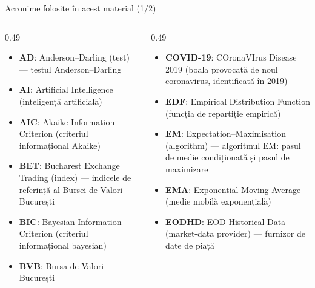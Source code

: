 
{
\begin{frame}[noframenumbering]
    \titlepage
\end{frame}
}
\begin{frame}{Acronime folosite în acest material (1/2)}
\begin{columns}[T]
\begin{column}{0.49\textwidth}
\begin{itemize}\setlength{\itemsep}{0pt}
    \item \textbf{AD}: Anderson–Darling (test) — testul Anderson–Darling
    \item \textbf{AI}: Artificial Intelligence (inteligență artificială)
    \item \textbf{AIC}: Akaike Information Criterion (criteriul informațional Akaike)
    \item \textbf{BET}: Bucharest Exchange Trading (index) — indicele de referință al Bursei de Valori București
    \item \textbf{BIC}: Bayesian Information Criterion (criteriul informațional bayesian)
    \item \textbf{BVB}: Bursa de Valori București
\end{itemize}
\end{column}
\begin{column}{0.49\textwidth}
\begin{itemize}\setlength{\itemsep}{0pt}
    \item \textbf{COVID-19}: COronaVIrus Disease 2019 (boala provocată de noul coronavirus, identificată în 2019)
    \item \textbf{EDF}: Empirical Distribution Function (funcția de repartiție empirică)
    \item \textbf{EM}: Expectation–Maximisation (algorithm) — algoritmul EM: pasul de medie condiționată și pasul de maximizare
    \item \textbf{EMA}: Exponential Moving Average (medie mobilă exponențială)
    \item \textbf{EODHD}: EOD Historical Data (market-data provider) — furnizor de date de piață
\end{itemize}
\end{column}
\end{columns}
\end{frame}
